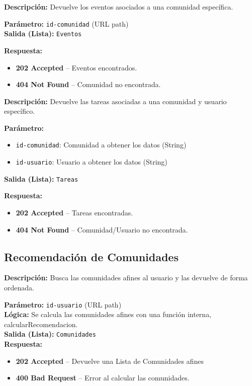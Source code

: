 \begin{tcolorbox}[title=\texttt{GET /comunidades/\{id-comunidad\}/eventos/}, colback=blue!5, colframe=blue!80!black]
\textbf{Descripción:} Devuelve los eventos asociados a una comunidad específica.

\textbf{Parámetro:} \texttt{id-comunidad} (URL path) \\
\textbf{Salida (Lista):} \texttt{Eventos} 

\textbf{Respuesta:}
\begin{itemize}[label=--]
    \item \textbf{202 Accepted} – Eventos encontrados.
    \item \textbf{404 Not Found} – Comunidad no encontrada.
\end{itemize}
\end{tcolorbox}

\begin{tcolorbox}[title=\texttt{GET /comunidades/\{id-comunidad\}/tareas/\{id-usuario\}/}, colback=blue!5, colframe=blue!80!black]
\textbf{Descripción:} Devuelve las tareas asociadas a una comunidad y usuario específico.

\textbf{Parámetro:}
\begin{itemize}[label=--]
    \item \texttt{id-comunidad}: Comunidad a obtener los datos (String)
    \item \texttt{id-usuario}: Usuario a obtener los datos (String)
\end{itemize}
\textbf{Salida (Lista):} \texttt{Tareas}

\textbf{Respuesta:}
\begin{itemize}[label=--]
    \item \textbf{202 Accepted} – Tareas encontradas.
    \item \textbf{404 Not Found} – Comunidad/Usuario no encontrada.
\end{itemize}
\end{tcolorbox}
\subsection{Recomendación de Comunidades}
\begin{tcolorbox}[title=\texttt{GET /usuarios/\{id-usuario\}/recomendaciones}, colback=blue!5, colframe=blue!80!black]
\textbf{Descripción:} Busca las comunidades afines al usuario y las devuelve de forma ordenada.

\textbf{Parámetro:} \texttt{id-usuario} (URL path) \\
\textbf{Lógica:}
Se calcula las comunidades afines con una función interna, calcularRecomendacion.\\
\textbf{Salida (Lista):} \texttt{Comunidades}\\
\textbf{Respuesta:}
\begin{itemize}[label=--]
    \item \textbf{202 Accepted} – Devuelve una Lista de Comunidades afines
    \item \textbf{400 Bad Request} – Error al calcular las comunidades.
\end{itemize}
\end{tcolorbox}

